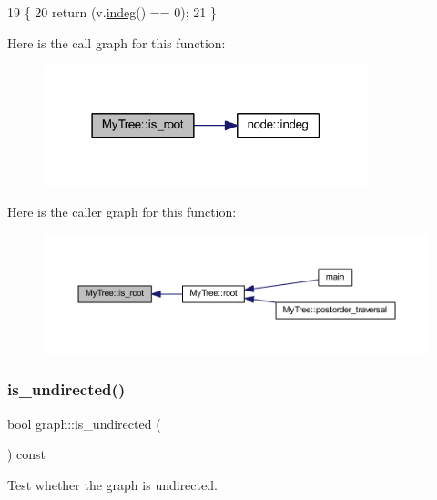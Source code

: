 \begin{DoxyCode}
19 \{
20     \textcolor{keywordflow}{return} (v.\mbox{\hyperlink{classnode_a749bfd1316584b96f8c9b0e44ad512f0}{indeg}}() == 0);
21 \}
\end{DoxyCode}
Here is the call graph for this function\+:\nopagebreak
\begin{figure}[H]
\begin{center}
\leavevmode
\includegraphics[width=267pt]{class_my_tree_a2590ac659aafc07741ee8bb28b457f54_cgraph}
\end{center}
\end{figure}
Here is the caller graph for this function\+:\nopagebreak
\begin{figure}[H]
\begin{center}
\leavevmode
\includegraphics[width=350pt]{class_my_tree_a2590ac659aafc07741ee8bb28b457f54_icgraph}
\end{center}
\end{figure}
\mbox{\label{classgraph_aba427ff8ba0f70c68416ec1351344cd8}} 
\subsubsection{\texorpdfstring{is\+\_\+undirected()}{is\_undirected()}}
{\footnotesize\ttfamily bool graph\+::is\+\_\+undirected (\begin{DoxyParamCaption}{ }\end{DoxyParamCaption}) const\hspace{0.3cm}{\ttfamily [inherited]}}

Test whether the graph is undirected.


